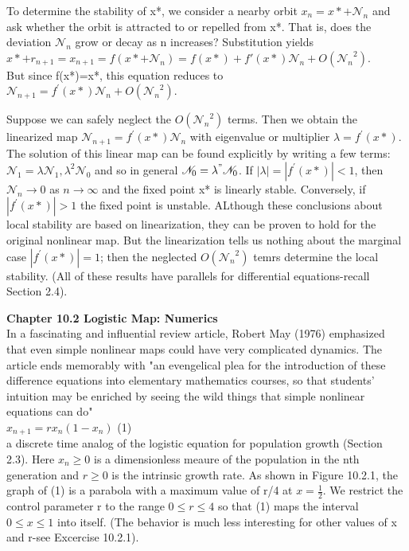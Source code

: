 \documentclass{article}
\newcommand\tab[1][1cm]{\hspace*{#1}}
\begin{document}
To determine the stability of x*, we consider a nearby orbit $x_{n}=x*+{\mathscr{N}_n}$ and ask whether the orbit is attracted to or repelled from x*. That is, does the deviation $\mathscr{N}_{n}$ grow or decay as n increases? Substitution yields \\ \tab \tab
$x*+r_{n+1}=x_{n+1}=f(x*+\mathscr{N}_{n})=f(x*)+f'(x*)\mathscr{N}_{n}+O({\mathscr{N}_{n}}^{2})$. \\

But since f(x*)=x*, this equation reduces to \\ \tab \tab
$\mathscr{N}_{n+1}=f^{'}(x*)\mathscr{N}_{n}+O({\mathscr{N}_{n}}^{2})$. \\ \tab

Suppose we can safely neglect the $O({\mathscr{N}_{n}}^{2})$ terms. Then we obtain the linearized map $\mathscr{N}_{n+1}=f^{'}(x*)\mathscr{N}_{n}$ with eigenvalue or multiplier $\lambda = f^{'}(x*)$. The solution of this linear map can be found explicitly by writing a few terms: $\mathscr{N}_{1}=\lambda \mathscr{N}_{1}, \lambda^{2}\mathscr{N}_{0}$ and so in general $\mathscr{N}_{0} = \lambda^{"}\mathscr{N}_{0}$. If $|\lambda|=|f^{'}(x*)|<1$, then $\mathscr{N}_{n} \to 0$ as $n \to \infty$ and the fixed point x* is linearly stable. Conversely, if $|f^{'}(x*)|>1$ the fixed point is unstable. ALthough these conclusions about local stability are based on linearization, they can be proven to hold for the original nonlinear map. But the linearization tells us nothing about the marginal case $|f^{'}(x*)|=1$; then the neglected $O({\mathscr{N}_{n}}^{2})$ temrs determine the local stability. (All of these results have parallels for differential equations-recall Section 2.4).

\textbf {Chapter 10.2 Logistic Map: Numerics} \\

In a fascinating and influential review article, Robert May (1976) emphasized that even simple nonlinear maps could have very complicated dynamics. The article ends memorably with "an evengelical plea for the introduction of these difference equations into elementary mathematics courses, so that students' intuition may be enriched by seeing the wild things that simple nonlinear equations can do" \\ \tab
$x_{n+1}=rx_{n}(1-x_{n})$ \tab (1) \\

a discrete time analog of the logistic equation for population growth (Section 2.3). Here $x_{n} \geq 0$ is a dimensionless meaure of the population in the nth generation and $r \geq 0$ is the intrinsic growth rate. As shown in Figure 10.2.1, the graph of (1) is a parabola with a maximum value of r/4 at $x=\frac{1}{2}$. We restrict the control parameter r to the range $0 \leq r \leq 4$ so that (1) maps the interval $0 \leq x \leq 1$ into itself. (The behavior is much less interesting for other values of x and r-see Excercise 10.2.1). \\
\end{document}
